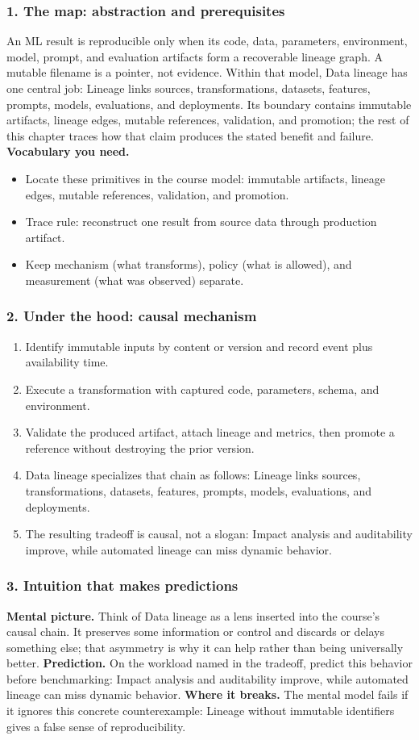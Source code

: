 \subsubsection*{1. The map: abstraction and prerequisites}
An ML result is reproducible only when its code, data, parameters, environment, model, prompt, and evaluation artifacts form a recoverable lineage graph. A mutable filename is a pointer, not evidence.
Within that model, Data lineage has one central job: Lineage links sources, transformations, datasets, features, prompts, models, evaluations, and deployments. Its boundary contains immutable artifacts, lineage edges, mutable references, validation, and promotion; the rest of this chapter traces how that claim produces the stated benefit and failure.
\textbf{Vocabulary you need.}\begin{itemize}
\item Locate these primitives in the course model: immutable artifacts, lineage edges, mutable references, validation, and promotion.
\item Trace rule: reconstruct one result from source data through production artifact.
\item Keep mechanism (what transforms), policy (what is allowed), and measurement (what was observed) separate.
\end{itemize}
\subsubsection*{2. Under the hood: causal mechanism}\begin{enumerate}
\item Identify immutable inputs by content or version and record event plus availability time.
\item Execute a transformation with captured code, parameters, schema, and environment.
\item Validate the produced artifact, attach lineage and metrics, then promote a reference without destroying the prior version.
\item Data lineage specializes that chain as follows: Lineage links sources, transformations, datasets, features, prompts, models, evaluations, and deployments.
\item The resulting tradeoff is causal, not a slogan: Impact analysis and auditability improve, while automated lineage can miss dynamic behavior.
\end{enumerate}
\subsubsection*{3. Intuition that makes predictions}
\textbf{Mental picture.} Think of Data lineage as a lens inserted into the course's causal chain. It preserves some information or control and discards or delays something else; that asymmetry is why it can help rather than being universally better.
\textbf{Prediction.} On the workload named in the tradeoff, predict this behavior before benchmarking: Impact analysis and auditability improve, while automated lineage can miss dynamic behavior.
\textbf{Where it breaks.} The mental model fails if it ignores this concrete counterexample: Lineage without immutable identifiers gives a false sense of reproducibility.
